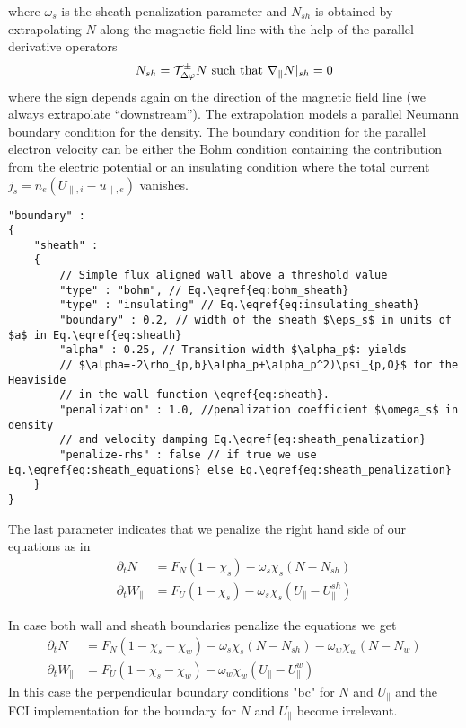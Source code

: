 where $\omega_s$ is the sheath penalization parameter and $N_{sh}$ is obtained by extrapolating $N$ along the magnetic field line with
the help of the parallel derivative operators
\begin{align}
    N_{sh} = \mathcal T^\pm_{\Delta\varphi} N \text{ such that } \nabla_\parallel N|_{sh} = 0
\end{align}
where the sign depends again on the direction of the magnetic field line (we always extrapolate ``downstream'').
The extrapolation models a parallel Neumann boundary condition for the density.
The boundary condition for the parallel electron velocity can be either the Bohm condition containing the contribution from the electric potential or
an insulating condition where the total current $j_s = n_e ( U_{\parallel,i} - u_{\parallel,e})$ vanishes.
\begin{verbatim}
"boundary" :
{
    "sheath" :
    {
        // Simple flux aligned wall above a threshold value
        "type" : "bohm", // Eq.\eqref{eq:bohm_sheath}
        "type" : "insulating" // Eq.\eqref{eq:insulating_sheath}
        "boundary" : 0.2, // width of the sheath $\eps_s$ in units of $a$ in Eq.\eqref{eq:sheath}
        "alpha" : 0.25, // Transition width $\alpha_p$: yields
        // $\alpha=-2\rho_{p,b}\alpha_p+\alpha_p^2)\psi_{p,O}$ for the Heaviside
        // in the wall function \eqref{eq:sheath}.
        "penalization" : 1.0, //penalization coefficient $\omega_s$ in density
        // and velocity damping Eq.\eqref{eq:sheath_penalization}
        "penalize-rhs" : false // if true we use Eq.\eqref{eq:sheath_equations} else Eq.\eqref{eq:sheath_penalization}
    }
}
\end{verbatim}
\noindent
The last parameter indicates that we penalize the right hand side of our equations
as in
\begin{subequations} \label{eq:sheath_equations}
\begin{align}
    \partial_t N &= F_N ( 1-\chi_s)  -\omega_s\chi_s (N-N_{sh})\\
    \partial_t W_\parallel &= F_U  ( 1 - \chi_s) -\omega_s\chi_s (U_\parallel-
        U_\parallel^{sh})
\end{align}
\end{subequations}

\begin{tcolorbox}[title=Note]
    In case both wall and sheath boundaries penalize the equations we get
    \begin{subequations} \label{eq:sheath_wall_equations}
    \begin{align}
        \partial_t N &= F_N ( 1-\chi_s - \chi_w)  -\omega_s\chi_s (N-N_{sh}) -\omega_w\chi_w (N-N_{w})\\
        \partial_t W_\parallel &= F_U  ( 1 - \chi_s- \chi_w) -\omega_w\chi_w (U_\parallel- U_\parallel^{w})
    \end{align}
    \end{subequations}
    In this case the perpendicular boundary
    conditions "bc" for $N$ and $U_\parallel$ and the FCI implementation for the
    boundary for $N$ and $U_\parallel$ become irrelevant.
\end{tcolorbox}

